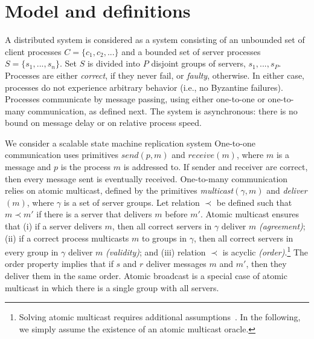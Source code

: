 \section{Model and definitions}

A distributed system is considered as a system consisting of an unbounded set of client processes $C = \{c_1, c_2, ...\}$ and a bounded set of server processes $S = \{s_1, ..., s_n\}$. Set $S$ is divided into $P$ disjoint groups of servers, $s_1, ..., s_P$. 
Processes are either \emph{correct}, if they never fail, or \emph{faulty}, otherwise. 
In either case, processes do not experience arbitrary behavior (i.e., no Byzantine failures).
Processes communicate by message passing, using either one-to-one or one-to-many communication, as defined next.
The system is asynchronous: there is no bound on message delay or on relative process speed.

We consider a scalable state machine replication system 
One-to-one communication uses primitives $send(p,m)$ and $receive(m)$, where $m$ is a message and $p$ is the process $m$ is addressed to. 
If sender and receiver are correct, then every message sent is eventually received. 
%
One-to-many communication relies on atomic multicast, defined by the primitives \emph{multicast}$(\gamma, m)$ and \emph{deliver}$(m)$, where $\gamma$ is a set of server groups.
%
Let relation $\prec$ be defined such that $m \prec m'$ if there is a server that delivers $m$ before $m'$.
Atomic multicast ensures that 
(i) if a server delivers $m$, then all correct servers in $\gamma$ deliver $m$ \emph{(agreement)};
(ii) if a correct process multicasts $m$ to groups in $\gamma$, then all correct servers in every group in $\gamma$ deliver $m$ \emph{(validity)}; and
(iii) relation $\prec$ is acyclic \emph{(order)}.\footnote{Solving atomic multicast requires additional assumptions~\cite{CT96,FLP85}. In the following, we simply assume the existence of an atomic multicast oracle.}
The order property implies that if $s$ and $r$ deliver messages $m$ and $m'$, then they deliver them in the same order. 
Atomic broadcast is a special case of atomic multicast in which there is a single group with all servers.